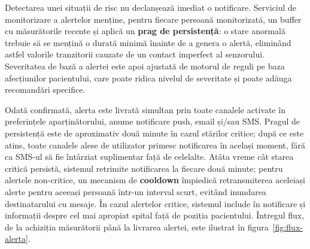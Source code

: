 ﻿\documentclass[12pt,a4paper,twoside]{article}
\begin{document}
Detectarea unei situații de risc nu declanșează imediat o notificare. Serviciul de monitorizare a alertelor menține, pentru fiecare persoană monitorizată, un buffer cu măsurătorile recente și aplică un \textbf{prag de persistență}: o stare anormală trebuie să se mențină o durată minimă înainte de a genera o alertă, eliminând astfel valorile tranzitorii cauzate de un contact imperfect al senzorului. Severitatea de bază a alertei este apoi ajustată de motorul de reguli pe baza afecțiunilor pacientului, care poate ridica nivelul de severitate și poate adăuga recomandări specifice.

Odată confirmată, alerta este livrată simultan prin toate canalele activate în preferințele aparținătorului, anume notificare push, email și/sau SMS. Pragul de persistență este de aproximativ două minute în cazul stărilor critice; după ce este atins, toate canalele alese de utilizator primesc notificarea în același moment, fără ca SMS-ul să fie întârziat suplimentar față de celelalte. Atâta vreme cât starea critică persistă, sistemul retrimite notificarea la fiecare două minute; pentru alertele non-critice, un mecanism de \textbf{cooldown} împiedică retransmiterea aceleiași alerte pentru aceeași persoană într-un interval scurt, evitând inundarea destinatarului cu mesaje. În cazul alertelor critice, sistemul include în notificare și informații despre cel mai apropiat spital față de poziția pacientului. Întregul flux, de la achiziția măsurătorii până la livrarea alertei, este ilustrat în figura~\ref{fig:flux-alerta}.
\end{document}
